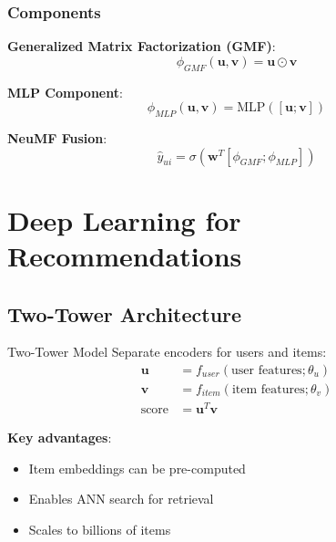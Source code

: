 \subsubsection{Components}

\textbf{Generalized Matrix Factorization (GMF)}:
\begin{equation}
\phi_{GMF}(\mathbf{u}, \mathbf{v}) = \mathbf{u} \odot \mathbf{v}
\end{equation}

\textbf{MLP Component}:
\begin{equation}
\phi_{MLP}(\mathbf{u}, \mathbf{v}) = \text{MLP}([\mathbf{u}; \mathbf{v}])
\end{equation}

\textbf{NeuMF Fusion}:
\begin{equation}
\hat{y}_{ui} = \sigma(\mathbf{w}^T[\phi_{GMF}; \phi_{MLP}])
\end{equation}

\section{Deep Learning for Recommendations}
\label{sec:deep_recsys}

\subsection{Two-Tower Architecture}

\begin{mathresult}{Two-Tower Model}
Separate encoders for users and items:
\begin{align}
\mathbf{u} &= f_{user}(\text{user features}; \theta_u) \\
\mathbf{v} &= f_{item}(\text{item features}; \theta_v) \\
\text{score} &= \mathbf{u}^T \mathbf{v}
\end{align}
\end{mathresult}

\textbf{Key advantages}:
\begin{itemize}
    \item Item embeddings can be pre-computed
    \item Enables ANN search for retrieval
    \item Scales to billions of items
\end{itemize}

